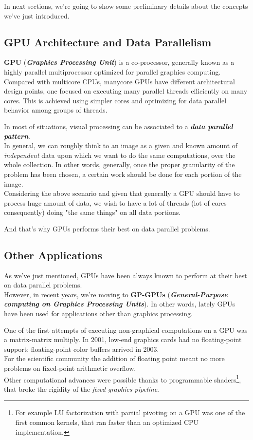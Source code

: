 	In next sections, we're going to show some preliminary details about the concepts we've just introduced.

\subsection{GPU Architecture and Data Parallelism}
	\textbf{GPU} (\textbf{\textit{Graphics Processing Unit}}) is a co-processor, generally known as a highly parallel multiprocessor optimized for parallel graphics computing.\\
	Compared with multicore CPUs, manycore GPUs have different architectural design points, one focused on executing many parallel threads efficiently on many cores.
	This is achieved using simpler cores and optimizing for data parallel behavior among groups of threads\cite{pattersonhennessy}.
	
	In most of situations, visual processing can be associated to a \textbf{\textit{data parallel pattern}}.\\
	In general, we can roughly think to an image as a given and known amount of \textit{independent} data upon which we want to do the same computations, over the whole collection. In other words, generally, once the proper granularity of the problem has been chosen, a certain work should be done for each portion of the image.\\
	Considering the above scenario and given that generally a GPU should have to process huge amount of data, we wish to have a lot of threads (lot of cores consequently) doing "the same things" on all data portions.
	
	And that's why GPUs performs their best on data parallel problems. 

\subsection{Other Applications}
\label{subs:otherApps}
	As we've just mentioned, GPUs have been always known to perform at their best on data parallel problems.\\
	However, in recent years, we're moving to \textbf{GP-GPUs} (\textbf{\textit{General-Purpose computing on Graphics Processing Units}}).
	In other words, lately GPUs have been used for applications other than graphics processing.
	
	
	One of the first attempts of executing non-graphical computations on a GPU was a matrix-matrix multiply. In 2001, low-end graphics cards had no floating-point support; floating-point color buffers arrived in 2003.\\
	For the scientific community the addition of floating point meant no more problems on fixed-point arithmetic overflow.\\	
	Other computational advances were possible thanks to programmable shaders\footnote{For example LU factorization with partial pivoting on a GPU was one of the first common kernels, that ran faster than an optimized CPU implementation.}, that broke the rigidity of the \textit{fixed graphics pipeline}.\\
	
